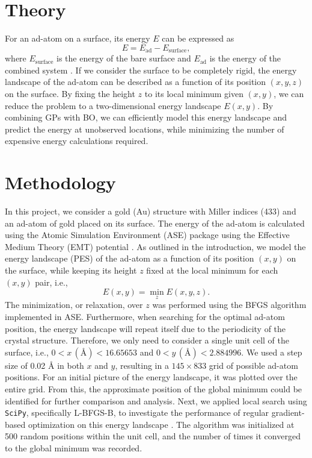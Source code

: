 \documentclass[a4paper, 12pt]{article}
\begin{document}
\section{Theory}
For an ad-atom on a surface, its energy $E$ can be expressed as 
\begin{equation}
E = E_{\text{ad}} - E_{\text{surface}},
\end{equation} 
where $E_\text{surface}$ is the energy of the bare surface and $E_\text{ad}$ is the energy of the combined system \cite{project}. If we consider the surface to be completely rigid, the energy landscape of the ad-atom can be described as a function of its position $(x, y, z)$ on the surface. By fixing the height $z$ to its local minimum given $(x, y)$, we can reduce the problem to a two-dimensional energy landscape $E(x, y)$. By combining GPs with BO, we can efficiently model this energy landscape and predict the energy at unobserved locations, while minimizing the number of expensive energy calculations required.
\section{Methodology}
In this project, we consider a gold (Au) structure with Miller indices (433) and an ad-atom of gold placed on its surface. The energy of the ad-atom is calculated using the Atomic Simulation Environment (ASE) package using the Effective Medium Theory (EMT) potential \cite{ase-paper}. As outlined in the introduction, we model the energy landscape (PES) of the ad-atom as a function of its position $(x, y)$ on the surface, while keeping its height $z$ fixed at the local minimum for each $(x, y)$ pair, i.e.,
\begin{equation}
E(x, y) = \min_z E(x, y, z).
\end{equation}
The minimization, or relaxation, over $z$ was performed using the BFGS algorithm implemented in ASE. Furthermore, when searching for the optimal ad-atom position, the energy landscape will repeat itself due to the periodicity of the crystal structure. Therefore, we only need to consider a single unit cell of the surface, i.e., $0 < x\,(\si{\angstrom}) < 16.65653$ and $0 < y\,(\si{\angstrom}) < 2.884996$. We used a step size of 0.02 \AA{} in both $x$ and $y$, resulting in a $145 \times 833$ grid of possible ad-atom positions. For an initial picture of the energy landscape, it was plotted over the entire grid. From this, the approximate position of the global minimum could be identified for further comparison and analysis. Next, we applied local search using \texttt{SciPy}, specifically L-BFGS-B, to investigate the performance of regular gradient-based optimization on this energy landscape \cite{2020SciPy-NMeth}. The algorithm was initialized at 500 random positions within the unit cell, and the number of times it converged to the global minimum was recorded. 
\end{document}
